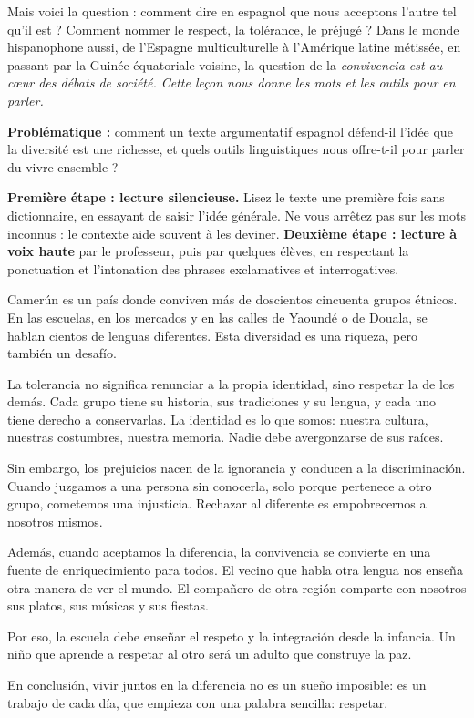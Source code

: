 \documentclass[11pt]{article}
\newcounter{popsec}
\newcounter{popsub}
\newcommand{\courssub}[1]{%
  \stepcounter{popsub}%
  \par\vspace{9pt}\noindent{\popxbold\fontsize{11.5}{13}\selectfont\color{popink}{\color{poporange}\thepopsec.\thepopsub}\hspace{6pt}#1}\par\nopagebreak\vspace{4pt}
}
\newcommand{\esp}[1]{\ifmmode\text{\textit{#1}}\else\begingroup\selectlanguage{spanish}\itshape #1\endgroup\fi}
\begin{document}
Mais voici la question : comment dire en espagnol que nous acceptons l'autre tel qu'il est ? Comment nommer le respect, la tolérance, le préjugé ? Dans le monde hispanophone aussi, de l'Espagne multiculturelle à l'Amérique latine métissée, en passant par la Guinée équatoriale voisine, la question de la \esp{convivencia} est au cœur des débats de société. Cette leçon nous donne les mots et les outils pour en parler.

\textbf{Problématique :} comment un texte argumentatif espagnol défend-il l'idée que la diversité est une richesse, et quels outils linguistiques nous offre-t-il pour parler du vivre-ensemble ?

\courssub{Lecture du texte}

\textbf{Première étape : lecture silencieuse.} Lisez le texte une première fois sans dictionnaire, en essayant de saisir l'idée générale. Ne vous arrêtez pas sur les mots inconnus : le contexte aide souvent à les deviner. \textbf{Deuxième étape : lecture à voix haute} par le professeur, puis par quelques élèves, en respectant la ponctuation et l'intonation des phrases exclamatives et interrogatives.

\begin{textebox}
Camerún es un país donde conviven más de doscientos cincuenta grupos étnicos. En las escuelas, en los mercados y en las calles de Yaoundé o de Douala, se hablan cientos de lenguas diferentes. Esta diversidad es una riqueza, pero también un desafío.

La tolerancia no significa renunciar a la propia identidad, sino respetar la de los demás. Cada grupo tiene su historia, sus tradiciones y su lengua, y cada uno tiene derecho a conservarlas. La identidad es lo que somos: nuestra cultura, nuestras costumbres, nuestra memoria. Nadie debe avergonzarse de sus raíces.

Sin embargo, los prejuicios nacen de la ignorancia y conducen a la discriminación. Cuando juzgamos a una persona sin conocerla, solo porque pertenece a otro grupo, cometemos una injusticia. Rechazar al diferente es empobrecernos a nosotros mismos.

Además, cuando aceptamos la diferencia, la convivencia se convierte en una fuente de enriquecimiento para todos. El vecino que habla otra lengua nos enseña otra manera de ver el mundo. El compañero de otra región comparte con nosotros sus platos, sus músicas y sus fiestas.

Por eso, la escuela debe enseñar el respeto y la integración desde la infancia. Un niño que aprende a respetar al otro será un adulto que construye la paz.

En conclusión, vivir juntos en la diferencia no es un sueño imposible: es un trabajo de cada día, que empieza con una palabra sencilla: respetar.
\end{textebox}
\end{document}

